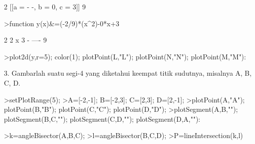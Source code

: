 \documentclass[12pt,arial,letterpaper]{book}
\begin{document}
\begin{eulercomment}
\begin{eulercomment}
\begin{eulercomment}
\begin{eulercomment}
\begin{eulercomment}
\begin{eulercomment}
\begin{eulercomment}
\begin{eulercomment}
\begin{eulercomment}
\begin{eulercomment}
\begin{eulercomment}
\begin{eulercomment}
\begin{eulercomment}
\begin{eulercomment}
\begin{eulercomment}
\begin{eulercomment}
\begin{eulercomment}
\begin{eulercomment}
\begin{eulercomment}
\begin{eulercomment}
\begin{eulercomment}
\begin{eulercomment}
\begin{eulercomment}
\begin{eulercomment}
\begin{eulercomment}
\begin{eulercomment}
\begin{eulercomment}
\begin{eulercomment}
\begin{eulercomment}
\begin{eulercomment}
\begin{eulercomment}
\begin{eulercomment}
\begin{euleroutput}
  
                                2
                        [[a = - -, b = 0, c = 3]]
                                9
  
\end{euleroutput}
\begin{eulerprompt}
>function y(x)&=(-2/9)*(x^2)-0*x+3
\end{eulerprompt}
\begin{euleroutput}
  
                                        2
                                     2 x
                                 3 - ----
                                      9
  
\end{euleroutput}
\begin{eulerprompt}
>plot2d(y,r=5); color(1); plotPoint(L,"L"); plotPoint(N,"N"); plotPoint(M,"M"):
\end{eulerprompt}
\begin{eulercomment}
3. Gambarlah suatu segi-4 yang diketahui keempat titik sudutnya,
misalnya A, B, C, D.
\end{eulercomment}
\begin{eulerprompt}
>setPlotRange(5);
>A=[-2,-1]; B=[-2,3]; C=[2,3]; D=[2,-1];
>plotPoint(A,"A"); plotPoint(B,"B"); plotPoint(C,"C"); plotPoint(D,"D");
>plotSegment(A,B,""); plotSegment(B,C,""); plotSegment(C,D,""); plotSegment(D,A,""):
\end{eulerprompt}
\begin{eulerprompt}
>k=angleBisector(A,B,C); 
>l=angleBisector(B,C,D);
>P=lineIntersection(k,l)
\end{eulerprompt}
\begin{euleroutput}
  [0,  1]
\end{euleroutput}

\end{eulercomment}
\end{eulercomment}
\end{eulercomment}
\end{eulercomment}
\end{eulercomment}
\end{eulercomment}
\end{eulercomment}
\end{eulercomment}
\end{eulercomment}
\end{eulercomment}
\end{eulercomment}
\end{eulercomment}
\end{eulercomment}
\end{eulercomment}
\end{eulercomment}
\end{eulercomment}
\end{eulercomment}
\end{eulercomment}
\end{eulercomment}
\end{eulercomment}
\end{eulercomment}
\end{eulercomment}
\end{eulercomment}
\end{eulercomment}
\end{eulercomment}
\end{eulercomment}
\end{eulercomment}
\end{eulercomment}
\end{eulercomment}
\end{eulercomment}
\end{eulercomment}
\end{eulercomment}
\end{document}
